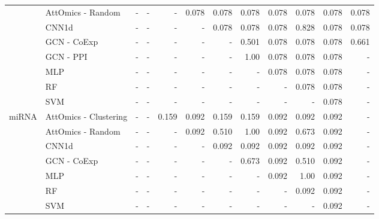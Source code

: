 \begin{sidewaystable}
\begin{tabular}{llrrrrrrrrrr}
		                       & AttOmics - Random     & -             & -                    & -                 & 0.078 & 0.078       & 0.078    & 0.078 & 0.078    & 0.078    & 0.078     \\
		                       & CNN1d                 & -             & -                    & -                 & -     & 0.078       & 0.078    & 0.078 & 0.828    & 0.078    & 0.078     \\
		                       & GCN - CoExp           & -             & -                    & -                 & -     & -           & 0.501    & 0.078 & 0.078    & 0.078    & 0.661     \\
		                       & GCN - PPI             & -             & -                    & -                 & -     & -           & 1.00     & 0.078 & 0.078    & 0.078    & -         \\
		                       & MLP                   & -             & -                    & -                 & -     & -           & -        & 0.078 & 0.078    & 0.078    & -         \\
		                       & RF                    & -             & -                    & -                 & -     & -           & -        & -     & 0.078    & 0.078    & -         \\
		                       & SVM                   & -             & -                    & -                 & -     & -           & -        & -     & -        & 0.078    & -         \\
		\midrule
		\multirow{7}{*}{miRNA} & AttOmics - Clustering & -             & -                    & 0.159             & 0.092 & 0.159       & 0.159    & 0.092 & 0.092    & 0.092    & -         \\
		                       & AttOmics - Random     & -             & -                    & -                 & 0.092 & 0.510       & 1.00     & 0.092 & 0.673    & 0.092    & -         \\
		                       & CNN1d                 & -             & -                    & -                 & -     & 0.092       & 0.092    & 0.092 & 0.092    & 0.092    & -         \\
		                       & GCN - CoExp           & -             & -                    & -                 & -     & -           & 0.673    & 0.092 & 0.510    & 0.092    & -         \\
		                       & MLP                   & -             & -                    & -                 & -     & -           & -        & 0.092 & 1.00     & 0.092    & -         \\
		                       & RF                    & -             & -                    & -                 & -     & -           & -        & -     & 0.092    & 0.092    & -         \\
		                       & SVM                   & -             & -                    & -                 & -     & -           & -        & -     & -        & 0.092    & -         \\
		\bottomrule
	\end{tabular}
\end{sidewaystable}


